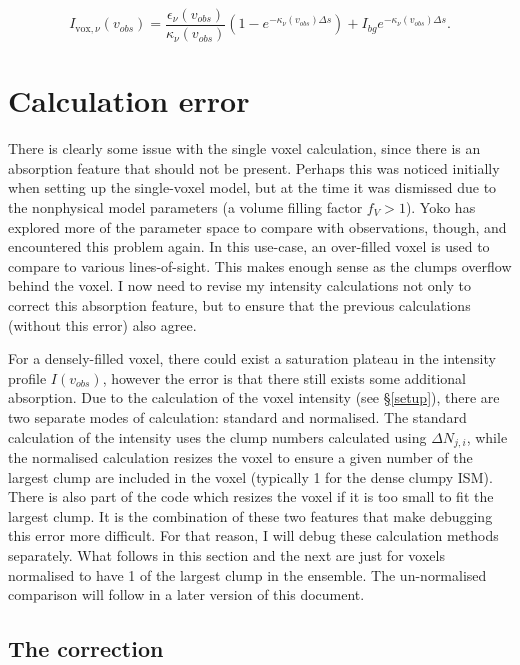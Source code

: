 \documentclass[a4paper]{article}
\begin{document}
    \[
    I_{\mathrm{vox},\nu} (v_{obs}) = \frac{\epsilon_\nu (v_{obs})}{\kappa_\nu (v_{obs})} \left( 1 - e^{-\kappa_\nu (v_{obs}) \Delta s} \right) + I_{bg} e^{-\kappa_\nu (v_{obs}) \Delta s}.
    \]

    \pagebreak

    \section{Calculation error}

    There is clearly some issue with the single voxel calculation, since there is an absorption feature that should not be present.
    Perhaps this was noticed initially when setting up the single-voxel model, but at the time it was dismissed due to the nonphysical model parameters (a volume filling factor \(f_V > 1\)).
    Yoko has explored more of the parameter space to compare with observations, though, and encountered this problem again.
    In this use-case, an over-filled voxel is used to compare to various lines-of-sight.
    This makes enough sense as the clumps overflow behind the voxel.
    I now need to revise my intensity calculations not only to correct this absorption feature, but to ensure that the previous calculations (without this error) also agree.

    For a densely-filled voxel, there could exist a saturation plateau in the intensity profile \(I(v_{obs})\), however the error is that there still exists some additional absorption.
    Due to the calculation of the voxel intensity (see \S \ref{setup}), there are two separate modes of calculation: standard and normalised.
    The standard calculation of the intensity uses the clump numbers calculated using \(\Delta N_{j,i}\), while the normalised calculation resizes the voxel to ensure a given number of the largest clump are included in the voxel (typically 1 for the dense clumpy ISM).
    There is also part of the code which resizes the voxel if it is too small to fit the largest clump.
    It is the combination of these two features that make debugging this error more difficult.
    For that reason, I will debug these calculation methods separately.
    What follows in this section and the next are just for voxels normalised to have 1 of the largest clump in the ensemble.
    The un-normalised comparison will follow in a later version of this document.

    \subsection{The correction}
\end{document}
